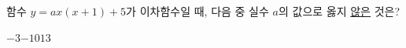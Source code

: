 함수 $y=ax(x+1)+5$가 이차함수일 때, 다음 중 실수 $a$의 값으로 옳지 \underline{않은} 것은?
\begin{choices32}{$-3$}{$-1$}{$0$}{$1$}{$3$}\end{choices32}
